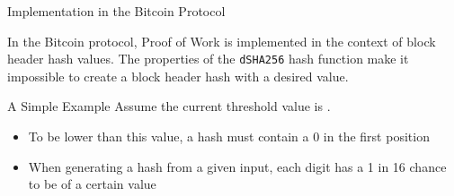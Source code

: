 \documentclass[]{beamer}
\begin{document}
\begin{frame}{Implementation in the Bitcoin Protocol}

In the Bitcoin protocol, Proof of Work is implemented in the context of \color{focus}block header hash values\color{black}. The properties of the \texttt{dSHA256} hash function make it impossible to create a block header hash with a desired value.


 	
\end{frame}

\begin{frame}{A Simple Example}
	Assume the current threshold value is
	.
	
	\begin{itemize}
		\item To be lower than this value, a hash must contain a 0 in the first position
		\item When generating a hash from a given input, each digit has a 1 in 16 chance to be of a certain value
	\end{itemize}

	
\end{frame}
\end{document}
